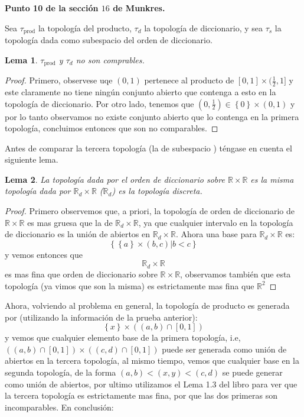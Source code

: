\documentclass[notitlepage]{article}
\newtheorem{lem}{Lema}
\newcommand{\set}[1]{\left\lbrace #1 \right\rbrace}
\newcommand{\RR}{\mathbb{R}}
\newcommand{\qt}[1]{\textrm{#1}}
\begin{document}
\textbf{Punto 10 de la sección $16$ de Munkres.}

Sea $ \tau_{\qt{prod}} $ la topología del producto, $\tau_{d} $ la topología de diccionario, y sea $ \tau_s$ la topología dada como subespacio del orden de diccionario. 

\begin{lem}
	$ \tau_{\qt{prod}} $ y $\tau_d$ no son comprables.
\end{lem}
\begin{proof}
	Primero, observese uqe $(0,1) $ pertenece al producto de $ [0,1] \times (\frac{1}{2},1] $ y este claramente no tiene ningún conjunto abierto que contenga  a esto en la topología de diccionario. Por otro lado, tenemos que $(0,\frac{1}{2}) \in \set{0} \times (0,1) $ y por lo tanto observamos no existe conjunto abierto que lo contenga en la primera topología, concluimos entonces que son no comparables.
\end{proof}
Antes de comparar la tercera topología (la de subespacio ) téngase en cuenta el siguiente lema.
\begin{lem}
	La topología dada por el orden de diccionario sobre $ \RR \times \RR $ es la misma topología dada por $ \RR_d \times \RR$ ($\RR_d$) es la topología discreta. 
\end{lem}
\begin{proof}
	Primero observemos que, a priori, la topología de orden de diccionario de $ \RR \times \RR$ es mas gruesa que la de  $ \RR_d \times \RR$, ya que cualquier intervalo en la topología de diccionario es la unión de abiertos en $ \RR_d \times \RR$. Ahora una base para $ \RR_d \times \RR$ es:
	\[ \set{\set{a} \times (b,c) | b<c} \] y vemos entonces que $$ \RR_d \times \RR$$ es mas fina que orden de diccionario sobre $ \RR \times \RR $, observamos también que esta topología (ya vimos que son la misma) es estrictamente mas fina que $ \RR^2$
\end{proof}

Ahora, volviendo al problema en general, la topología de producto es generada por (utilizando la información de la prueba anterior):
\[ \set{x} \times ((a,b) \cap [0,1]) \]
y vemos que cualquier elemento base de la primera topología, i.e, $ ((a,b) \cap [0,1]) \times ((c,d) \cap [0,1]) $ puede ser generada como unión de abiertos en la tercera topología, al mismo tiempo, vemos que cualquier base en la segunda topología, de la forma $(a,b) < (x,y) < (c,d) $ se puede generar como unión de abiertos, por ultimo utilizamos el Lema 1.3 del libro para ver que la tercera topología es estrictamente mas fina, por que las dos primeras son incomparables. En conclusión:

\end{document}
